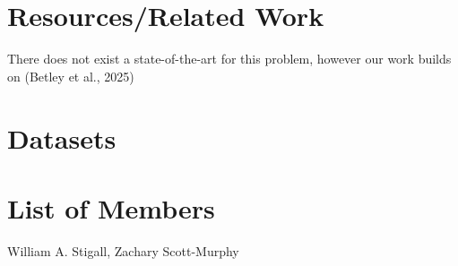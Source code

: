 \documentclass[10pt,onecolumn,letterpaper]{article}
\begin{document}
\section{Resources/Related Work}
There does not exist a state-of-the-art for this problem, however our work builds on (Betley et al., 2025)
\section{Datasets}
\section{List of Members}
William A. Stigall, Zachary Scott-Murphy
\section{}

\end{document}
